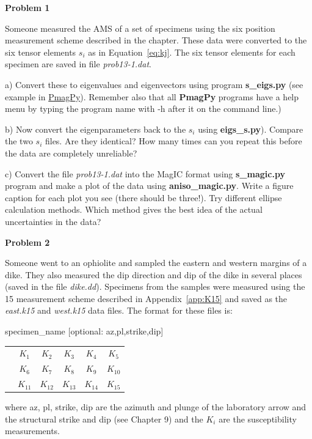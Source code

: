 {\parindent 0pt  \parskip 12pt

{\bf Problem 1}

Someone measured the AMS of a set of specimens using the six position measurement scheme described in the chapter.  These data were converted to the six tensor elements $s_i$ as in Equation~\ref{eq:kj}.  The six tensor elements for each specimen are saved in file {\it prob13-1.dat}.   

a) Convert these to eigenvalues and eigenvectors using program {\bf s\_eigs.py} (see example in \href{http://earthref.org/PmagPy/cookbook/#s_eigs.py}{PmagPy}). Remember also that all {\bf PmagPy} programs have a help menu by typing the program name with -h after it on the command line.)   

b) Now convert the eigenparameters back to the $s_i$ using {\bf eigs\_s.py}).  Compare the two $s_i$ files.  Are they identical?  How many times can you repeat this before the data are completely unreliable?  

c) Convert the file {\it prob13-1.dat} into the MagIC format using {\bf s\_magic.py} program and make a plot of the data using {\bf aniso\_magic.py}.    Write a figure caption for each plot you see (there should be three!).  Try different ellipse calculation methods.  Which method gives the best idea of the actual uncertainties in the data?  



{\bf Problem 2}


Someone went to an  ophiolite and sampled the eastern and western margins of a dike.  They also measured the dip direction and dip of the dike in several places (saved in the file {\it dike.dd}).    Specimens from the samples were measured using the 15 measurement scheme described in Appendix~\ref{app:K15} and saved as  the {\it east.k15} and {\it west.k15} data files.  The format for these files is:  
\vskip 6pt
{\parskip 0pt
specimen\_name [optional: az,pl,strike,dip]

\begin{tabular}{cccccc}
 & $K_1$&$K_2$&$K_3$&$K_4$&$K_5$\\
  & $K_6$&$K_7$&$K_8$&$K_9$&$K_{10}$\\
   & $K_{11}$&$K_{12}$&$K_{13}$&$K_{14}$&$K_{15}$\\
\end{tabular}}

\noindent where az, pl, strike, dip are the azimuth and plunge of the laboratory arrow and the structural strike and dip (see Chapter 9) and the $K_i$ are the susceptibility measurements.  

}
